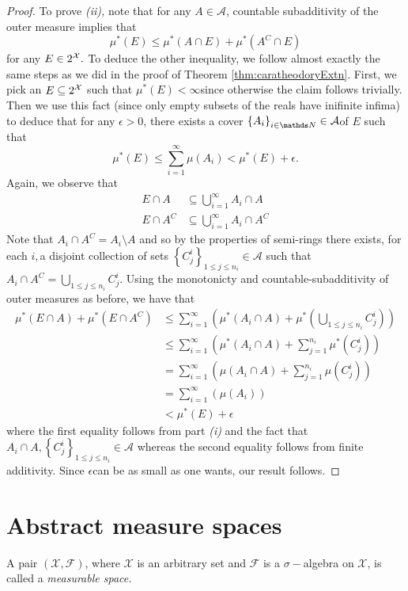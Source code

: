\begin{proof}
To prove \emph{(ii), }note that for any $A\in\mathcal{A}$, countable
subadditivity of the outer measure implies that 
\[
\mu^{*}\left(E\right)\leq\mu^{*}\left(A\cap E\right)+\mu^{*}\left(A^{C}\cap E\right)
\]
for any $E\in2^{\mathcal{X}}.$ To deduce the other inequality, we follow almost
exactly the same steps as we did in the proof of Theorem \ref{thm:caratheodoryExtn}.
First, we pick an $E\subseteq2^{\mathcal{X}}$ such that $\mu^{*}\left(E\right)<\infty$since
otherwise the claim follows trivially. Then we use this fact (since
only empty subsets of the reals have inifinite infima) to deduce that
for any $\epsilon>0$, there exists a cover $\left\{ A_{i}\right\} _{i\in\N}\in\mathcal{A}$of
$E$ such that
\[
\mu^{*}\left(E\right)\leq\sum_{i=1}^{\infty}\mu\left(A_{i}\right)<\mu^{*}\left(E\right)+\epsilon.
\]
Again, we observe that 
\begin{align*}
E\cap A & \subseteq\bigcup_{i=1}^{\infty}A_{i}\cap A\\
E\cap A^{C} & \subseteq\bigcup_{i=1}^{\infty}A_{i}\cap A^{C}
\end{align*}
Note that $A_{i}\cap A^{C}=A_{i}\setminus A$ and so by the properties
of semi-rings there exists, for each $i,$a disjoint collection of
sets $\left\{ C_{j}^{i}\right\} _{1\leq j\leq n_{i}}\in\mathcal{A}$
such that $A_{i}\cap A^{C}=\bigcup_{1\leq j\leq n_{i}}C_{j}^{i}.$
Using the monotonicty and countable-subadditivity of outer measures
as before, we have that
\begin{align*}
\mu^{*}\left(E\cap A\right)+\mu^{*}\left(E\cap A^{C}\right) & \leq\sum_{i=1}^{\infty}\left(\mu^{*}\left(A_{i}\cap A\right)+\mu^{*}\left(\bigcup_{1\leq j\leq n_{i}}C_{j}^{i}\right)\right)\\
 & \leq\sum_{i=1}^{\infty}\left(\mu^{*}\left(A_{i}\cap A\right)+\sum_{j=1}^{n_{i}}\mu^{*}\left(C_{j}^{i}\right)\right)\\
 & =\sum_{i=1}^{\infty}\left(\mu\left(A_{i}\cap A\right)+\sum_{j=1}^{n_{i}}\mu\left(C_{j}^{i}\right)\right)\\
 & =\sum_{i=1}^{\infty}\left(\mu\left(A_{i}\right)\right)\\
 & <\mu^{*}\left(E\right)+\epsilon
\end{align*}
where the first equality follows from part \emph{(i) }and the fact
that $A_{i}\cap A,\left\{ C_{j}^{i}\right\} _{1\leq j\leq n_{i}}\in\mathcal{A}$
whereas the second equality follows from finite additivity. Since
$\epsilon$can be as small as one wants, our result follows.
\end{proof}

\section{Abstract measure spaces}
\begin{defn}
\label{def:measurableSpace}A pair $\left(\mathcal{X},\mathcal{F}\right)$,
where $\mathcal{X}$ is an arbitrary set and $\mathcal{F}$ is a $\sigma-$algebra
on $\mathcal{X}$, is called a \emph{measurable space.}
\end{defn}

